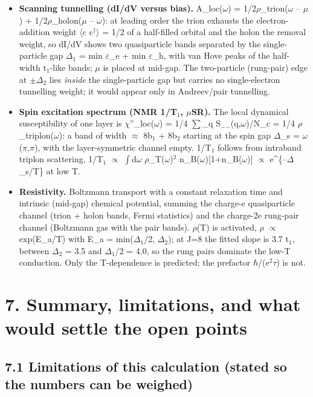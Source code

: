 \documentclass[10pt]{article}
\begin{document}
\begin{itemize}
\item \textbf{Scanning tunnelling (dI/dV versus bias).} A\_loc($\omega$) = 1/2$\rho$\_trion($\omega$ -- $\mu$) + 1/2$\rho$\_holon($\mu$ -- $\omega$): at leading order the
trion exhausts the electron-addition weight $\langle$c c$^\dagger$$\rangle$ = 1/2 of a half-filled orbital and the holon the removal
weight, so dI/dV shows two quasiparticle bands separated by the single-particle gap $\Delta$$_1$ = min $\varepsilon$\_e + min $\varepsilon$\_h,
with van Hove peaks of the half-width t$_1$-like bands; $\mu$ is placed at mid-gap. The two-particle (rung-pair) edge
at $\pm$$\Delta$$_2$ lies \emph{inside} the single-particle gap but carries no single-electron tunnelling weight; it would appear
only in Andreev/pair tunnelling.
\item \textbf{Spin excitation spectrum (NMR 1/T$_1$, $\mu$SR).} The local dynamical susceptibility of one layer is
$\chi$''\_loc($\omega$) = 1/4 $\sum$\_q S$_-$$_-$(q,$\omega$)/N\_c = 1/4 $\rho$\_triplon($\omega$): a band of width $\approx$ 8b$_1$ + 8b$_2$ starting at the spin gap
$\Delta$\_s = $\omega$($\pi$,$\pi$), with the layer-symmetric channel empty. 1/T$_1$ follows from intraband triplon scattering,
1/T$_1$ $\propto$ $\int$d$\omega$ $\rho$\_T($\omega$)$^2$ n\_B($\omega$)[1+n\_B($\omega$)] $\propto$ e\^{}\{--$\Delta$\_s/T\} at low T.
\item \textbf{Resistivity.} Boltzmann transport with a constant relaxation time and intrinsic (mid-gap) chemical potential,
summing the charge-e quasiparticle channel (trion + holon bands, Fermi statistics) and the charge-2e rung-pair
channel (Boltzmann gas with the pair bands). $\rho$(T) is activated, $\rho$ $\propto$ exp(E\_a/T) with E\_a = min($\Delta$$_1$/2, $\Delta$$_2$); at
J=8 the fitted slope is 3.7 t$_1$, between $\Delta$$_2$ = 3.5 and $\Delta$$_1$/2 = 4.0, so the rung pairs dominate the low-T
conduction. Only the T-dependence is predicted; the prefactor $\hbar$/(e$^2$$\tau$) is not.
\end{itemize}

\section*{7. Summary, limitations, and what would settle the open points}

\subsection*{7.1 Limitations of this calculation (stated so the numbers can be weighed)}
\end{document}
